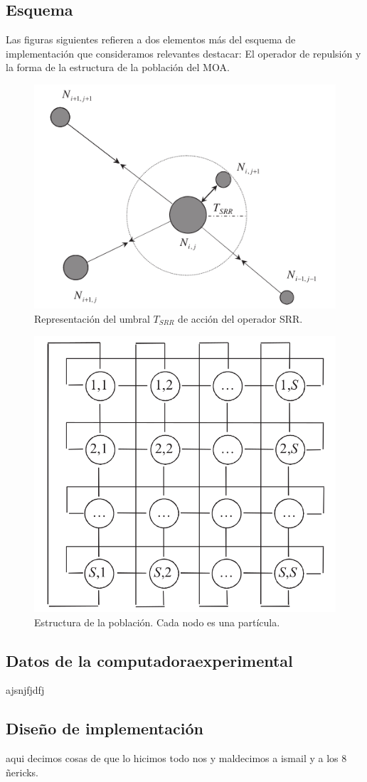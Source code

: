 \documentclass[12pt]{article}
\begin{document}
\subsection*{Esquema}
Las figuras siguientes refieren a dos elementos más del esquema de
implementación que consideramos relevantes destacar: El operador de repulsión y la forma de la estructura de la población del MOA.\newpage
\begin{multicols}{2}
\begin{figure}[H]
  \centering
  \includegraphics[width=.5\textwidth]{SRR}
  \caption{Representación del umbral $T_{SRR}$ de acción del operador SRR.}
\end{figure}
\begin{figure}[H]
  \centering
  \includegraphics[width=.437\textwidth]{cell}
  \caption{Estructura de la población. Cada nodo es una partícula.}
\end{figure}
\end{multicols}

\subsection*{Datos de la computadoraexperimental}
ajsnjfjdfj

\subsection*{Diseño de implementación}
aqui decimos cosas de que lo hicimos todo nos y maldecimos a ismail
y a los 8 ñericks.
\end{document}
